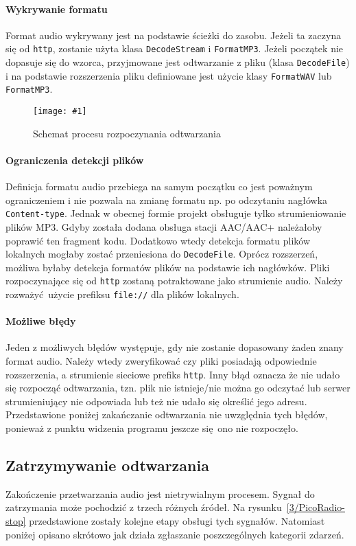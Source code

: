 \documentclass[polish]{aghengthesis}
\newcommand{\imgint}[4]{
	\begin{figure}[{#4}]
		\centering
		\texttt{[image: \#1]}
		\caption{#2}
		\label{#1}
	\end{figure}
}
\newcommand{\imgh}[3]{\imgint{#1}{#2}{#3}{H}}
\begin{document}
			\paragraph{Wykrywanie formatu}
				Format audio wykrywany jest na podstawie ścieżki do zasobu. Jeżeli ta zaczyna się od \lstinline|http|, zostanie użyta klasa \lstinline|DecodeStream| i \lstinline|FormatMP3|. Jeżeli początek nie dopasuje się do wzorca, przyjmowane jest odtwarzanie z pliku (klasa \lstinline|DecodeFile|) i na podstawie rozszerzenia pliku definiowane jest użycie klasy \lstinline|FormatWAV| lub \lstinline|FormatMP3|.
				
			\imgh{3/PicoRadio-start}{Schemat procesu rozpoczynania odtwarzania}{0.7}
				
			\paragraph{Ograniczenia detekcji plików}
				Definicja formatu audio przebiega na samym początku co jest poważnym ograniczeniem i nie pozwala na zmianę formatu np. po odczytaniu nagłówka \lstinline|Content-type|. Jednak w obecnej formie projekt obsługuje tylko strumieniowanie plików MP3. Gdyby została dodana obsługa stacji AAC/AAC+ należałoby poprawić ten fragment kodu. Dodatkowo wtedy detekcja formatu plików lokalnych mogłaby zostać przeniesiona do \lstinline|DecodeFile|. Oprócz rozszerzeń, możliwa byłaby detekcja formatów plików na podstawie ich nagłówków. Pliki rozpoczynające się od \lstinline|http| zostaną potraktowane jako strumienie audio. Należy rozważyć użycie prefiksu \lstinline|file://| dla plików lokalnych.
			
			\paragraph{Możliwe błędy}
				Jeden z możliwych błędów występuje, gdy nie zostanie dopasowany żaden znany format audio. Należy wtedy zweryfikować czy pliki posiadają odpowiednie rozszerzenia, a strumienie sieciowe prefiks \lstinline|http|. Inny błąd oznacza że nie udało się rozpocząć odtwarzania, tzn. plik nie istnieje/nie można go odczytać lub serwer strumieniujący nie odpowiada lub też nie udało się określić jego adresu. Przedstawione poniżej zakańczanie odtwarzania nie uwzględnia tych błędów, ponieważ z punktu widzenia programu jeszcze się ono nie rozpoczęło.
		
		\subsection{Zatrzymywanie odtwarzania}
			Zakończenie przetwarzania audio jest nietrywialnym procesem. Sygnał do zatrzymania może pochodzić z trzech różnych źródeł. Na rysunku~\ref{3/PicoRadio-stop} przedstawione zostały kolejne etapy obsługi tych sygnałów. Natomiast poniżej opisano skrótowo jak działa zgłaszanie poszczególnych kategorii zdarzeń. 
			
\end{document}
